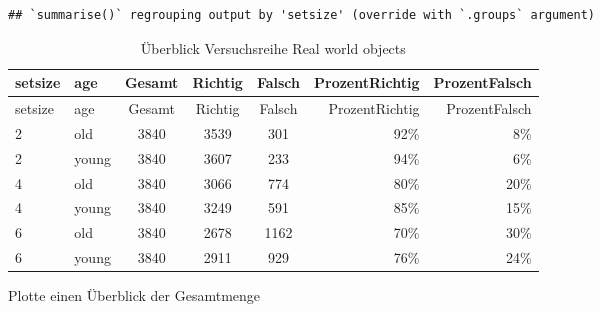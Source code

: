\documentclass[
]{article}
\newenvironment{Shaded}{\begin{snugshade}}{\end{snugshade}}
\newcommand{\DataTypeTok}[1]{\textcolor[rgb]{0.13,0.29,0.53}{#1}}
\newcommand{\DecValTok}[1]{\textcolor[rgb]{0.00,0.00,0.81}{#1}}
\newcommand{\KeywordTok}[1]{\textcolor[rgb]{0.13,0.29,0.53}{\textbf{#1}}}
\newcommand{\NormalTok}[1]{#1}
\newcommand{\OperatorTok}[1]{\textcolor[rgb]{0.81,0.36,0.00}{\textbf{#1}}}
\newcommand{\StringTok}[1]{\textcolor[rgb]{0.31,0.60,0.02}{#1}}
\begin{document}
\begin{verbatim}
## `summarise()` regrouping output by 'setsize' (override with `.groups` argument)
\end{verbatim}

\begin{longtable}[]{@{}llcccrr@{}}
\caption{Überblick Versuchsreihe Real world objects}\tabularnewline
\toprule
setsize & age & Gesamt & Richtig & Falsch & ProzentRichtig &
ProzentFalsch\tabularnewline
\midrule
\endfirsthead
\toprule
setsize & age & Gesamt & Richtig & Falsch & ProzentRichtig &
ProzentFalsch\tabularnewline
\midrule
\endhead
2 & old & 3840 & 3539 & 301 & 92\% & 8\%\tabularnewline
2 & young & 3840 & 3607 & 233 & 94\% & 6\%\tabularnewline
4 & old & 3840 & 3066 & 774 & 80\% & 20\%\tabularnewline
4 & young & 3840 & 3249 & 591 & 85\% & 15\%\tabularnewline
6 & old & 3840 & 2678 & 1162 & 70\% & 30\%\tabularnewline
6 & young & 3840 & 2911 & 929 & 76\% & 24\%\tabularnewline
\bottomrule
\end{longtable}

Plotte einen Überblick der Gesamtmenge

\begin{Shaded}
\end{Shaded}
\end{document}
